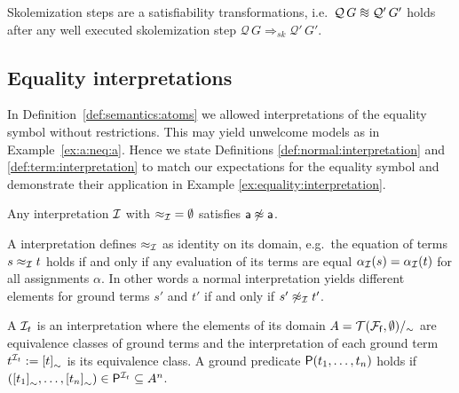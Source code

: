 \begin{lemma}
	\cite{Bundy1984}
	Skolemization steps are a satisfiability transformations, 
	i.e.~\( \mcQ\,G \equisat \mcQ'\,G' \)
	holds after any well executed skolemization step
	\( \mathcal{Q}\,G \Rightarrow_{sk} \mathcal{Q}'\,G' \).
\end{lemma}

\subsection{Equality interpretations}

\noindent In Definition~\vref{def:semantics:atoms} we allowed
interpretations of the equality symbol without restrictions.
This may yield unwelcome models as in Example~\vref{ex:a:neq:a}.
Hence we state Definitions \vref{def:normal:interpretation} 
and \vref{def:term:interpretation}
to match our expectations for the equality symbol
and demonstrate their application in Example \vref{ex:equality:interpretation}.

\begin{example}\label{ex:a:neq:a}
	Any interpretation \( \mathcal{I} \)
	with \( {\approx_{\mathcal{I}}} = \emptyset \) satisfies \( \mathsf{a}\not\approx\mathsf{a} \).
\end{example}


\begin{definition}\label{def:normal:interpretation}
	A  interpretation defines \( \approx_{\mathcal{I}} \) as identity on its domain,
	e.g.~the equation of terms \( s \approx_{\mathcal{I}} t \) holds if and only
	if any evaluation of its terms are equal \( \alpha_{\mathcal{I}}(s) = \alpha_{\mathcal{I}}(t) \)
	for all assignments \( \alpha \).
	In other words a normal interpretation yields different elements
	for ground terms \( s' \) and \( t' \) if and only if \( s'\not\approx_{\mathcal{I}} t' \).
\end{definition}

\begin{definition}\label{def:term:interpretation}
	A 
	\( \mathcal{I}_t \)
	is an interpretation
	where the elements of its domain \( A = {\mathcal{T}(\mathcal{F}_{\mathsf{f}},\emptyset)}/_\sim \)
	are equivalence classes of ground terms
	and the interpretation of each ground term \( t^{\mathcal{I}_t} := {[t]}_\sim \) is its equivalence class.
	A ground predicate \( \mathsf{P}(t_1,\ldots,t_n) \) holds if
	\( ({[t_1]}_\sim,\ldots,{[t_n]}_\sim) \in \mathsf{P}^{\mathcal{I}_t} \subseteq A^n \).
\end{definition}


